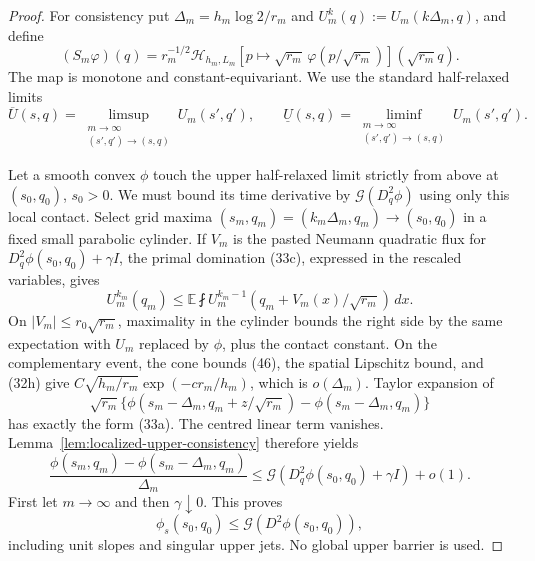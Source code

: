 \documentclass{aomart}
\theoremstyle{definition}
\newcommand{\1}{\mathbf 1}
\begin{document}
\begin{proof}
For consistency put $\Delta_m=h_m\log2/r_m$ and
$U_m^k(q):=U_m(k\Delta_m,q)$, and define
\begin{equation}
(S_ m\varphi)(q)=r_ m^{-1/2}\mathcal H_ {h_ m,L_ m}
[p\mapsto\sqrt{r_ m}\,\varphi(p/\sqrt{r_ m})](\sqrt{r_ m}q).
\tag{46b}
\end{equation}
The map is monotone and constant-equivariant.
We use the standard half-relaxed limits
\[
\overline U(s,q)=\limsup_{\substack{m\to\infty\\(s',q')\to(s,q)}}
U_m(s',q'),\qquad
\underline U(s,q)=\liminf_{\substack{m\to\infty\\(s',q')\to(s,q)}}
U_m(s',q').
\]

Let a smooth convex $\phi$ touch the upper half-relaxed limit strictly
from above at $(s_0,q_0)$, $s_0>0$.  We must bound its time derivative
by $\mathcal G(D_q^2\phi)$ using only this local contact.
Select grid maxima
$(s_ m,q_ m)=(k_ m\Delta_ m,q_ m)\to(s_ 0,q_ 0)$ in a fixed small
parabolic cylinder.  If $V_ m$ is the pasted Neumann quadratic flux for
$D_ q^2\phi(s_ 0,q_ 0)+\gamma I$, the primal domination (33c), expressed
in the rescaled variables, gives
\begin{equation}
U_ m^{k_ m}(q_ m)
\leq\mathbb E\fint
U_ m^{k_ m-1}(q_ m+V_ m(x)/\sqrt{r_ m})\,dx.
\tag{46c}
\end{equation}
On $|V_ m|\leq r_ 0\sqrt{r_ m}$, maximality in the cylinder bounds the
right side by the same expectation with $U_ m$ replaced by
$\phi$, plus the contact constant.  On the complementary event, the
cone bounds (46), the spatial Lipschitz bound, and (32h) give
$C\sqrt{h_ m/r_ m}\exp(-c r_ m/h_ m)$, which is
$o(\Delta_ m)$.  Taylor expansion of
\begin{equation*}
\sqrt{r_ m}\{\phi(s_ m-\Delta_ m,q_ m+z/\sqrt{r_ m})
-\phi(s_ m-\Delta_ m,q_ m)\}
\end{equation*}
has exactly the form (33a).  The centred linear term vanishes.  Lemma~\ref{lem:localized-upper-consistency} therefore yields
\begin{equation}
\frac{\phi(s_ m,q_ m)-\phi(s_ m-\Delta_ m,q_ m)}{\Delta_ m}
\leq \mathcal G(D_ q^2\phi(s_ 0,q_ 0)+\gamma I)+o(1).
\tag{46d}
\end{equation}
First let $m\to\infty$ and then $\gamma\downarrow0$.  This proves
\begin{equation}
\phi_ s(s_ 0,q_ 0)\leq \mathcal G(D^2\phi(s_ 0,q_ 0)),
\tag{47}
\end{equation}
including unit slopes and singular upper jets.  No global upper barrier
is used.


\end{proof}
\end{document}
